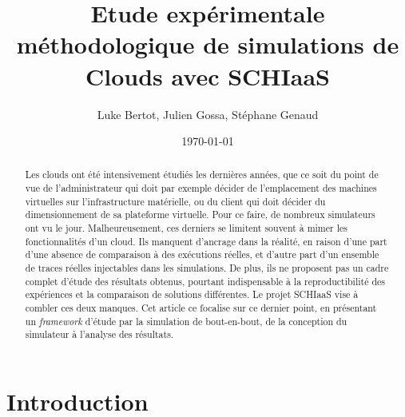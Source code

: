 \documentclass[parallelisme]{compas2017}
\begin{document}
\title{Etude expérimentale méthodologique de simulations de Clouds avec SCHIaaS}

\author{Luke Bertot, Julien Gossa, Stéphane Genaud}%

\address{Université De Strasbourg,\\
Laboratoire ICube - Pôle API - 300 Bd Sébastien Brant\\
67400 Illkirch-Graffenstaden - France\\
lbertot@unistra.fr gossa@unistra.fr genaud@unistra.fr }

\date{\today}

\maketitle

\begin{abstract}

Les clouds ont été intensivement étudiés les dernières années, que ce soit du 
point de vue de l'administrateur qui doit par exemple décider de l'emplacement
des machines virtuelles sur l'infrastructure matérielle, ou du client qui doit 
décider du dimensionnement de sa plateforme virtuelle. Pour ce faire, de 
nombreux
simulateurs ont vu le jour. Malheureusement, ces derniers se limitent souvent à 
mimer les fonctionnalités d'un cloud. Ils manquent d'ancrage dans la 
réalité, en raison d'une part d'une absence de comparaison à des exécutions réelles, 
et d'autre part d'un ensemble de traces réelles injectables dans les 
simulations. De plus, ils ne proposent pas un cadre complet d'étude
des résultats obtenus, pourtant indispensable à la reproductibilité des 
expériences et la comparaison de solutions différentes.
Le projet SCHIaaS vise à combler ces deux manques. Cet article ce focalise sur 
ce dernier point, en présentant un \textit{framework} d'étude par la 
simulation de bout-en-bout, de la conception du simulateur à l'analyse des 
résultats.

\end{abstract}


\section{Introduction}
\end{document}
